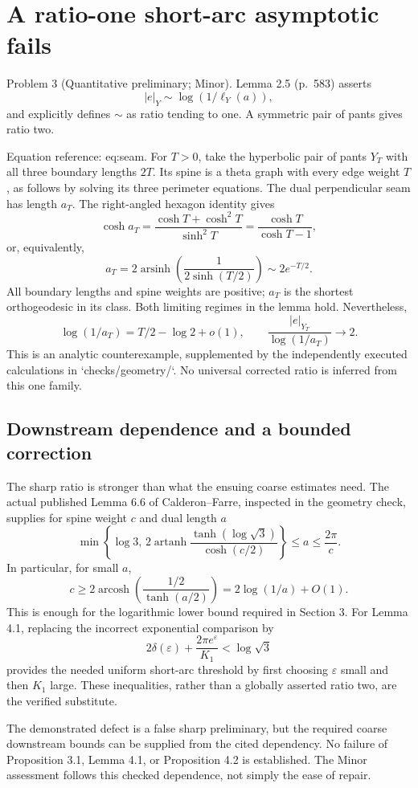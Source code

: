 \documentclass[10pt]{article}
\begin{document}
\section*{A ratio-one short-arc asymptotic fails}
Problem 3 (Quantitative preliminary; Minor).  Lemma 2.5 (p. 583) asserts \[|e|_Y\sim\log(1/\ell_Y(a)),\] and explicitly defines \(\sim\) as ratio tending to one. A symmetric pair of pants gives ratio two.\par
Equation reference: eq:seam. For \(T>0\), take the hyperbolic pair of pants \(Y_T\) with all three boundary lengths \(2T\). Its spine is a theta graph with every edge weight \(T\), as follows by solving its three perimeter equations. The dual perpendicular seam has length \(a_T\). The right-angled hexagon identity gives \[\cosh a_T
 =\frac{\cosh T+\cosh^2T}{\sinh^2T}
 =\frac{\cosh T}{\cosh T-1},\] or, equivalently, \[
 a_T=2\operatorname{arsinh}\!\left(\frac{1}{2\sinh(T/2)}\right)
     \sim2e^{-T/2}.\] All boundary lengths and spine weights are positive; \(a_T\) is the shortest orthogeodesic in its class. Both limiting regimes in the lemma hold. Nevertheless, \[\log(1/a_T)=T/2-\log2+o(1),\qquad
 \frac{|e|_{Y_T}}{\log(1/a_T)}\longrightarrow2.\] This is an analytic counterexample, supplemented by the independently executed calculations in `checks/geometry/`. No universal corrected ratio is inferred from this one family.\par
\subsection*{Downstream dependence and a bounded correction}
The sharp ratio is stronger than what the ensuing coarse estimates need. The actual published Lemma 6.6 of Calderon–Farre, inspected in the geometry check, supplies for spine weight \(c\) and dual length \(a\) \[\min\!\left\{\log3,\,
 2\operatorname{artanh}
 \frac{\tanh(\log\sqrt3)}{\cosh(c/2)}\right\}
 \le a\le\frac{2\pi}{c}.\] In particular, for small \(a\), \[c\ge2\operatorname{arcosh}
       \left(\frac{1/2}{\tanh(a/2)}\right)
     =2\log(1/a)+O(1).\] This is enough for the logarithmic lower bound required in Section 3. For Lemma 4.1, replacing the incorrect exponential comparison by \[2\delta(\varepsilon)+\frac{2\pi e^\varepsilon}{K_1}
       <\log\sqrt3\] provides the needed uniform short-arc threshold by first choosing \(\varepsilon\) small and then \(K_1\) large. These inequalities, rather than a globally asserted ratio two, are the verified substitute.\par
The demonstrated defect is a false sharp preliminary, but the required coarse downstream bounds can be supplied from the cited dependency. No failure of Proposition 3.1, Lemma 4.1, or Proposition 4.2 is established. The Minor assessment follows this checked dependence, not simply the ease of repair.\par
\end{document}
